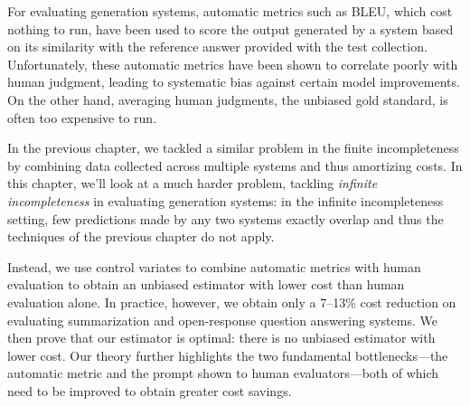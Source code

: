 For evaluating generation systems, automatic metrics such as BLEU, which cost nothing to run, have been used to score the output generated by a system based on its similarity with the reference answer provided with the test collection.
Unfortunately, these automatic metrics have been shown to correlate poorly with human judgment, leading to systematic bias against certain model improvements.
On the other hand, averaging human judgments, the unbiased gold standard, is often too expensive to run.

In the previous chapter, we tackled a similar problem in the finite incompleteness by combining data collected across multiple systems and thus amortizing costs.
In this chapter, we'll look at a much harder problem, tackling \textit{infinite incompleteness} in evaluating generation systems:
in the infinite incompleteness setting, few predictions made by any two systems exactly overlap and thus the techniques of the previous chapter do not apply.

Instead, we use control variates to combine automatic metrics with human evaluation to
obtain an unbiased estimator with lower cost than human evaluation alone.
In practice, however, we obtain only a 7--13\% cost reduction on evaluating summarization and open-response question answering systems.
We then prove that our estimator is optimal: there is no unbiased estimator with lower cost.
Our theory further highlights the two fundamental bottlenecks---the automatic
metric and the prompt shown to human evaluators---both of which need to be improved to obtain greater cost savings.
